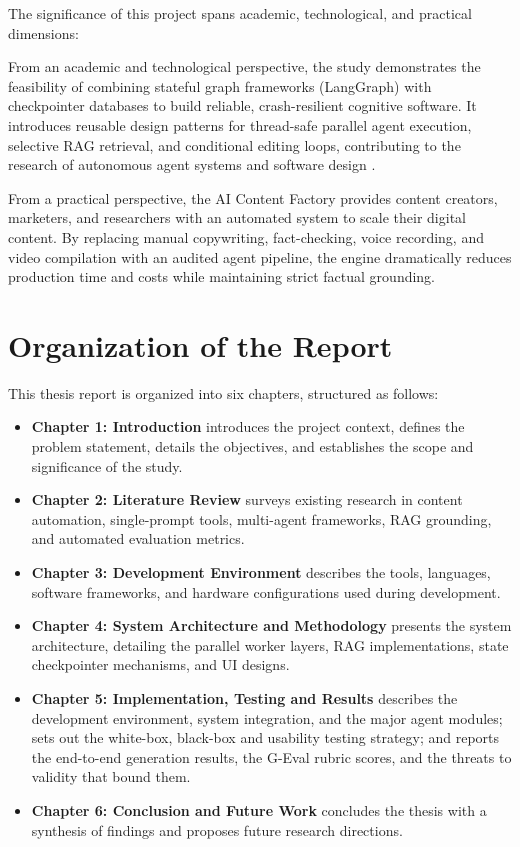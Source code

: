 The significance of this project spans academic, technological, and practical dimensions:

From an academic and technological perspective, the study demonstrates the feasibility of combining stateful graph frameworks (LangGraph) with checkpointer databases to build reliable, crash-resilient cognitive software. It introduces reusable design patterns for thread-safe parallel agent execution, selective RAG retrieval, and conditional editing loops, contributing to the research of autonomous agent systems and software design \cite{seidl2015uml}.

From a practical perspective, the AI Content Factory provides content creators, marketers, and researchers with an automated system to scale their digital content. By replacing manual copywriting, fact-checking, voice recording, and video compilation with an audited agent pipeline, the engine dramatically reduces production time and costs while maintaining strict factual grounding.

\section{Organization of the Report}

This thesis report is organized into six chapters, structured as follows:

\begin{itemize}
    \item \textbf{Chapter 1: Introduction} introduces the project context, defines the problem statement, details the objectives, and establishes the scope and significance of the study.
    \item \textbf{Chapter 2: Literature Review} surveys existing research in content automation, single-prompt tools, multi-agent frameworks, RAG grounding, and automated evaluation metrics.
    \item \textbf{Chapter 3: Development Environment} describes the tools, languages, software frameworks, and hardware configurations used during development.
    \item \textbf{Chapter 4: System Architecture and Methodology} presents the system architecture, detailing the parallel worker layers, RAG implementations, state checkpointer mechanisms, and UI designs.
    \item \textbf{Chapter 5: Implementation, Testing and Results} describes the development environment, system integration, and the major agent modules; sets out the white-box, black-box and usability testing strategy; and reports the end-to-end generation results, the G-Eval rubric scores, and the threats to validity that bound them.
    \item \textbf{Chapter 6: Conclusion and Future Work} concludes the thesis with a synthesis of findings and proposes future research directions.
\end{itemize}
